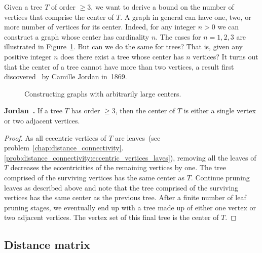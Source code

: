 Given a tree $T$ of order $\geq 3$, we want to derive a bound on the
number of vertices that comprise the center of $T$. A graph in general
can have one, two, or more number of vertices for its center. Indeed,
for any integer $n > 0$ we can construct a graph whose center has
cardinality $n$. The cases for $n = 1, 2, 3$ are illustrated in
Figure~\ref{fig:distance_connectivity:graphs_arbitrarily_large_centers}. But
can we do the same for trees? That is, given any positive integer $n$
does there exist a tree whose center has $n$ vertices? It turns out
that the center of a tree cannot have more than two vertices, a result
first discovered~\cite{Jordan1869} by Camille
Jordan in~1869.

\begin{figure}[!htbp]
\centering

\caption{Constructing graphs with arbitrarily large centers.}
\label{fig:distance_connectivity:graphs_arbitrarily_large_centers}
\end{figure}

\begin{theorem}
\textbf{Jordan~\cite{Jordan1869}.}
If a tree $T$ has order $\geq 3$, then the center of $T$ is either a
single vertex or two adjacent vertices.
\end{theorem}

\begin{proof}
As all eccentric vertices of $T$ are leaves~(see
problem~\ref{chap:distance_connectivity}.\ref{prob:distance_connectivity:eccentric_vertices_laves}),
removing all the leaves of $T$ decreases the eccentricities of the
remaining vertices by one. The tree comprised of the surviving
vertices has the same center as $T$. Continue pruning leaves as
described above and note that the tree comprised of the surviving
vertices has the same center as the previous tree. After a finite
number of leaf pruning stages, we eventually end up with a tree made
up of either one vertex or two adjacent vertices. The vertex set of
this final tree is the center of $T$.
\end{proof}



\subsection{Distance matrix}

